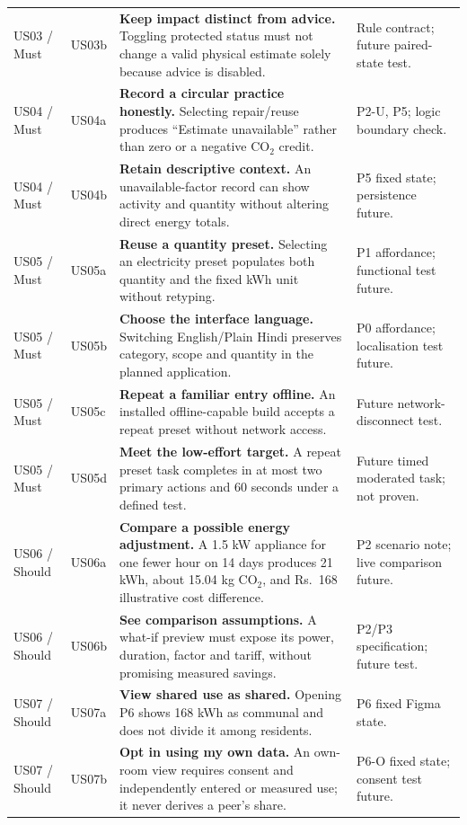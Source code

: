 \documentclass[12pt,a4paper]{article}
\begin{document}
\begin{longtable}{@{}>{\raggedright\arraybackslash}p{1.75cm}>{\raggedright\arraybackslash}p{1.07cm}>{\raggedright\arraybackslash}p{6.45cm}>{\raggedright\arraybackslash}p{3.3cm}@{}}
US03 / Must & US03b & \textbf{Keep impact distinct from advice.} Toggling protected status must not change a valid physical estimate solely because advice is disabled. & Rule contract; future paired-state test.\\
\rowcolor{RowGray}US04 / Must & US04a & \textbf{Record a circular practice honestly.} Selecting repair/reuse produces “Estimate unavailable” rather than zero or a negative CO$_2$ credit. & P2-U, P5; logic boundary check.\\
US04 / Must & US04b & \textbf{Retain descriptive context.} An unavailable-factor record can show activity and quantity without altering direct energy totals. & P5 fixed state; persistence future.\\
\rowcolor{RowGray}US05 / Must & US05a & \textbf{Reuse a quantity preset.} Selecting an electricity preset populates both quantity and the fixed kWh unit without retyping. & P1 affordance; functional test future.\\
US05 / Must & US05b & \textbf{Choose the interface language.} Switching English/Plain Hindi preserves category, scope and quantity in the planned application. & P0 affordance; localisation test future.\\
\rowcolor{RowGray}US05 / Must & US05c & \textbf{Repeat a familiar entry offline.} An installed offline-capable build accepts a repeat preset without network access. & Future network-disconnect test.\\
US05 / Must & US05d & \textbf{Meet the low-effort target.} A repeat preset task completes in at most two primary actions and 60 seconds under a defined test. & Future timed moderated task; not proven.\\
\rowcolor{RowGray}US06 / Should & US06a & \textbf{Compare a possible energy adjustment.} A 1.5 kW appliance for one fewer hour on 14 days produces 21 kWh, about 15.04 kg CO$_2$, and Rs.~168 illustrative cost difference. & P2 scenario note; live comparison future.\\
US06 / Should & US06b & \textbf{See comparison assumptions.} A what-if preview must expose its power, duration, factor and tariff, without promising measured savings. & P2/P3 specification; future test.\\
\rowcolor{RowGray}US07 / Should & US07a & \textbf{View shared use as shared.} Opening P6 shows 168 kWh as communal and does not divide it among residents. & P6 fixed Figma state.\\
US07 / Should & US07b & \textbf{Opt in using my own data.} An own-room view requires consent and independently entered or measured use; it never derives a peer's share. & P6-O fixed state; consent test future.\\

\end{longtable}
\end{document}
